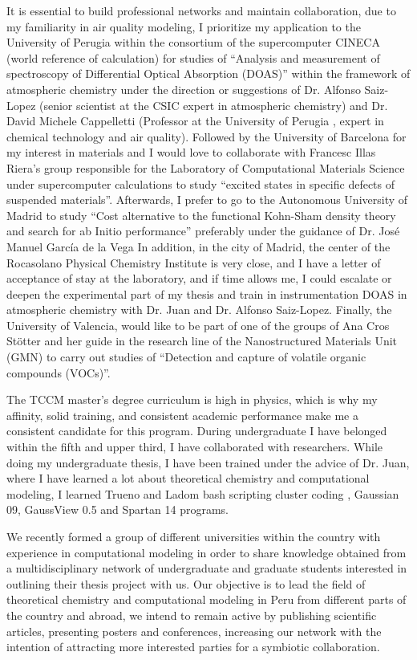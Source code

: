 \documentclass[11pt,a4paper,roman]{moderncv}        %
\begin{document}
It is essential to build professional networks and maintain collaboration, due to my familiarity in air quality modeling, I prioritize my application to the University of Perugia within the consortium of the supercomputer CINECA (world reference of calculation) for studies of “Analysis and measurement of spectroscopy of Differential Optical Absorption (DOAS)” within the framework of atmospheric chemistry under the direction or suggestions of Dr. Alfonso Saiz-Lopez (senior scientist at the CSIC expert in atmospheric chemistry) and Dr. David Michele Cappelletti (Professor at the University of Perugia , expert in chemical technology and air quality). Followed by the University of Barcelona for my interest in materials and I would love to collaborate with Francesc Illas Riera's group responsible for the Laboratory of Computational Materials Science under supercomputer calculations to study ``excited states in specific defects of suspended materials''. Afterwards, I prefer to go to the Autonomous University of Madrid to study ``Cost alternative to the functional Kohn-Sham density theory and search for ab Initio performance'' preferably under the guidance of Dr. José Manuel García de la Vega In addition, in the city of Madrid, the center of the Rocasolano Physical Chemistry Institute is very close, and I have a letter of acceptance of stay at the laboratory, and if time allows me, I could escalate or deepen the experimental part of my thesis and train in instrumentation DOAS in atmospheric chemistry with Dr. Juan and Dr. Alfonso Saiz-Lopez. Finally, the University of Valencia, would like to be part of one of the groups of Ana Cros Stötter and her guide in the research line of the Nanostructured Materials Unit (GMN) to carry out studies of ``Detection and capture of volatile organic compounds (VOCs)''.

The TCCM master's degree curriculum is high in physics, which is why my affinity, solid training, and consistent academic performance make me a consistent candidate for this program. During undergraduate I have belonged within the fifth and upper third, I have collaborated with researchers. While doing my undergraduate thesis, I have been trained under the advice of Dr. Juan, where I have learned a lot about theoretical chemistry and computational modeling, I learned Trueno and Ladom bash scripting cluster coding , Gaussian 09, GaussView 0.5 and Spartan 14 programs.

We recently formed a group of different universities within the country with experience in computational modeling in order to share knowledge obtained from a multidisciplinary network of undergraduate and graduate students interested in outlining their thesis project with us. Our objective is to lead the field of theoretical chemistry and computational modeling in Peru from different parts of the country and abroad, we intend to remain active by publishing scientific articles, presenting posters and conferences, increasing our network with the intention of attracting more interested parties for a symbiotic collaboration.
\end{document}
